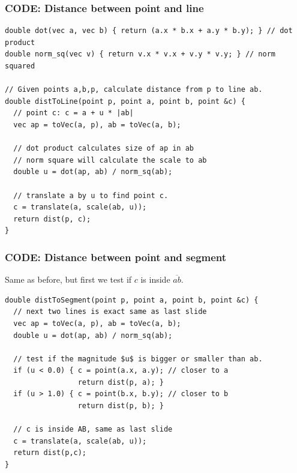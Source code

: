 \begin{frame}[fragile]
  \frametitle{CODE: Distance between point and line}

  {\smaller
  \begin{exampleblock}{}
\begin{verbatim}
double dot(vec a, vec b) { return (a.x * b.x + a.y * b.y); } // dot product
double norm_sq(vec v) { return v.x * v.x + v.y * v.y; } // norm squared

// Given points a,b,p, calculate distance from p to line ab.
double distToLine(point p, point a, point b, point &c) {
  // point c: c = a + u * |ab|
  vec ap = toVec(a, p), ab = toVec(a, b);

  // dot product calculates size of ap in ab
  // norm square will calculate the scale to ab
  double u = dot(ap, ab) / norm_sq(ab);

  // translate a by u to find point c.
  c = translate(a, scale(ab, u));
  return dist(p, c);
}
\end{verbatim}
  \end{exampleblock}

}
\end{frame}

\begin{frame}[fragile]
  \frametitle{CODE: Distance between point and segment}
  Same as before, but first we test if $c$ is inside $\overline{ab}$.

  {\smaller
    \begin{exampleblock}{}
\begin{verbatim}
double distToSegment(point p, point a, point b, point &c) {
  // next two lines is exact same as last slide
  vec ap = toVec(a, p), ab = toVec(a, b);
  double u = dot(ap, ab) / norm_sq(ab);

  // test if the magnitude $u$ is bigger or smaller than ab.
  if (u < 0.0) { c = point(a.x, a.y); // closer to a
                 return dist(p, a); }
  if (u > 1.0) { c = point(b.x, b.y); // closer to b
                 return dist(p, b); }

  // c is inside AB, same as last slide
  c = translate(a, scale(ab, u));
  return dist(p,c);
}
\end{verbatim}
    \end{exampleblock}
  }
\end{frame}
